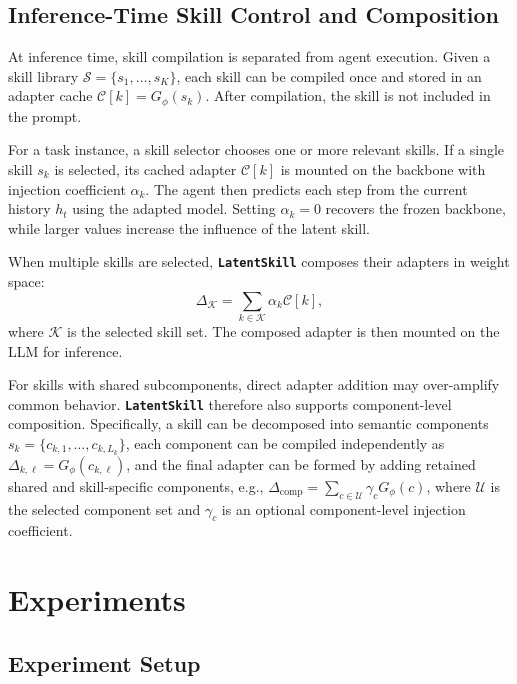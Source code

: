 \documentclass{llmxive}
\providecommand{\textttt}[1]{\texttt{#1}}
\providecommand{\method}{\textbf{\textttt{LatentSkill}}}
\begin{document}
\subsection{Inference-Time Skill Control and Composition}
\label{sec:inference}

At inference time, skill compilation is separated from agent execution. Given a skill library $\mathcal{S}=\{s_1,\ldots,s_K\}$, each skill can be compiled once and stored in an adapter cache $\mathcal{C}[k]=G_\phi(s_k)$. After compilation, the skill is not included in the prompt.

For a task instance, a skill selector chooses one or more relevant skills. If a single skill $s_k$ is selected, its cached adapter $\mathcal{C}[k]$ is mounted on the backbone with injection coefficient $\alpha_k$. The agent then predicts each step from the current history $h_t$ using the adapted model. Setting $\alpha_k=0$ recovers the frozen backbone, while larger values increase the influence of the latent skill.

When multiple skills are selected, \method{} composes their adapters in weight space:
\begin{equation}
    \Delta_{\mathcal{K}}
    =
    \sum_{k\in \mathcal{K}}
    \alpha_k \mathcal{C}[k],
\end{equation}
where $\mathcal{K}$ is the selected skill set. The composed adapter is then mounted on the LLM for inference.

For skills with shared subcomponents, direct adapter addition may over-amplify common behavior. \method{} therefore also supports component-level composition. Specifically, a skill can be decomposed into semantic components $s_k=\{c_{k,1},\ldots,c_{k,L_k}\}$, each component can be compiled independently as $\Delta_{k,\ell}=G_\phi(c_{k,\ell})$, and the final adapter can be formed by adding retained shared and skill-specific components, e.g., $\Delta_{\mathrm{comp}}=\sum_{c\in\mathcal{U}}\gamma_cG_\phi(c)$, where $\mathcal{U}$ is the selected component set and $\gamma_c$ is an optional component-level injection coefficient.

\section{Experiments}

\subsection{Experiment Setup}
\end{document}
